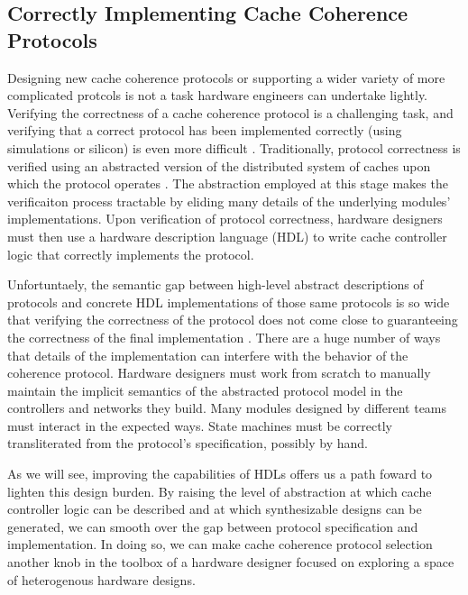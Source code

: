 \subsection{Correctly Implementing Cache Coherence Protocols}

Designing new cache coherence protocols or supporting a wider variety of more complicated protcols is not a task hardware engineers can undertake lightly.
Verifying the correctness of a cache coherence protocol is a challenging task, and
verifying that a correct protocol has been implemented correctly (using simulations or silicon) is even more difficult
\cite{deorio2008post, bentley2001validating, burckhardt2005verifying, clarke1995verification, dill1992protocol, wood1990verifying}.
Traditionally, protocol correctness is verified using an abstracted version of the distributed system of caches upon which the protocol operates
\cite{talupur2008going, delzanno2003constraint, pong1997verification, wood1990verifying, mcmillan2001parameterized}.
The abstraction employed at this stage makes the verificaiton process tractable by eliding many details of the underlying modules' implementations.
Upon verification of protocol correctness, hardware designers must then use a hardware description language (HDL) to write cache controller logic that correctly implements the protocol.

Unfortuntaely, the semantic gap between high-level abstract descriptions of protocols and 
concrete HDL implementations of those same protocols is so wide that verifying the correctness of the protocol
does not come close to guaranteeing the correctness of the final implementation \cite{dave-memocode05}.
There are a huge number of ways that details of the implementation can interfere with the behavior of the coherence protocol.
Hardware designers must work from scratch to manually maintain the implicit semantics of the abstracted protocol model in the controllers and networks they build.
Many modules designed by different teams must interact in the expected ways.
State machines must be correctly transliterated from the protocol's specification, possibly by hand.

As we will see, improving the capabilities of HDLs offers us a path foward to lighten this design burden.
By raising the level of abstraction at which cache controller logic can be described and at which synthesizable designs can be generated,
we can smooth over the gap between protocol specification and implementation.
In doing so, we can make cache coherence protocol selection another knob in the toolbox of a hardware designer focused on exploring a space of heterogenous hardware designs.

